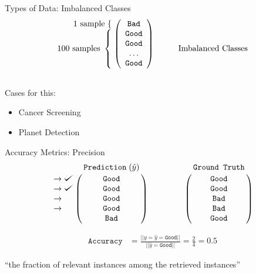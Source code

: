 \documentclass{beamer}
\def\checkmark{\tikz\fill[scale=0.4](0,.35) -- (.25,0) -- (1,.7) -- (.25,.15) -- cycle;}
\begin{document}
\begin{frame}{Types of Data: Imbalanced Classes}
\[
  \begin{array}{@{} c @{}}
    \begin{array}{@{} r @{}}
      \text{1 sample}~\{\hspace{\nulldelimiterspace} \\
      \text{100 samples}~\left\{\begin{array}{@{}c@{}}\null\\\null\\\null\\\null\end{array}\right.
    \end{array}
    \left (
      \begin{array}{ *{1}{c} }
        \texttt{Bad}  \\
        \texttt{Good}  \\
        \texttt{Good}  \\
        \ldots  \\
        \texttt{Good}  \\
      \end{array}
    \right ) \\
    \mathstrut
  \end{array}
  \quad \quad \quad
  \text{Imbalanced Classes}
\]

\pause

Cases for this:
\begin{itemize}%
\item Cancer Screening
\item Planet Detection
\end{itemize}

\end{frame}

\begin{frame}{Accuracy Metrics: Precision}
$$
\bordermatrix{&\texttt{Prediction}\;(\hat{y})\cr
               \rightarrow\checkmark&\texttt{Good}\cr
               \rightarrow\checkmark&\texttt{Good}\cr
                \rightarrow&\texttt{Good}\cr
                \rightarrow&\texttt{Good}\cr
               &\texttt{Bad}}
\qquad \qquad
\bordermatrix{&\texttt{Ground Truth}\cr
                &\texttt{Good}\cr
                &\texttt{Good}\cr
                &\texttt{Bad}\cr
                &\texttt{Bad}\cr
                &\texttt{Good}}
$$

\begin{align*}
\texttt{Accuracy} &= \frac{||y = \hat{y} = \texttt{Good}||}{||\hat{y} = \texttt{Good}||} = \frac{2}{4} = 0.5
\end{align*}

``the fraction of relevant instances among the retrieved instances''

\end{frame}
\end{document}
